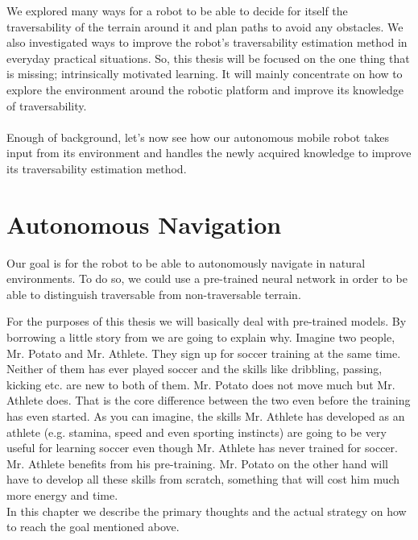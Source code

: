\documentclass[12pt,a4paper,table,dvipsnames,tikz]{report}
\begin{document}
	We explored many ways for a robot to be able to decide for itself the 
	traversability of the terrain around it and plan paths to avoid any obstacles. 
	We also investigated ways to improve the robot's traversability estimation 
	method in everyday practical situations. So, this thesis will be focused on the 
	one thing that is missing; intrinsically motivated learning. It will mainly 
	concentrate on how to explore the environment around the robotic platform and 
	improve its knowledge of traversability.
	\\\\
	
	Enough of background, let’s now see how our autonomous mobile robot takes input 
	from its environment and handles the newly acquired knowledge to improve its 
	traversability estimation method.
	\\
	
	
	\chapter{Autonomous Navigation}
	\label{sec:fg}
	
	Our goal is for the robot to be able to autonomously navigate in natural environments. 
	To do so, we could use a pre-trained neural network in order to be able to distinguish 
	traversable from non-traversable terrain.
	\par
	For the purposes of this thesis we will basically deal with pre-trained models. By
	borrowing a little story from \citet{Gupta} we are going to explain why. Imagine two 
	people, Mr. Potato and Mr. Athlete. They sign up for soccer training at the same time. 
	Neither of them has ever played soccer and the skills like dribbling, passing, 
	kicking etc. are new to both of them. Mr. Potato does not move much but Mr. Athlete 
	does. That is the core difference between the two even before the training has even 
	started. As you can imagine, the skills Mr. Athlete has developed as an athlete 
	(e.g. stamina, speed and even sporting instincts) are going to be very useful for 
	learning soccer even though Mr. Athlete has never trained for soccer. Mr. Athlete 
	benefits from his pre-training. Mr. Potato on the other hand will have to develop all 
	these skills from scratch, something that will cost him much more energy and time.
	\\
	
	In this chapter we describe the primary thoughts and the actual strategy on how to 
	reach the goal mentioned above.
	\\
	
\end{document}
